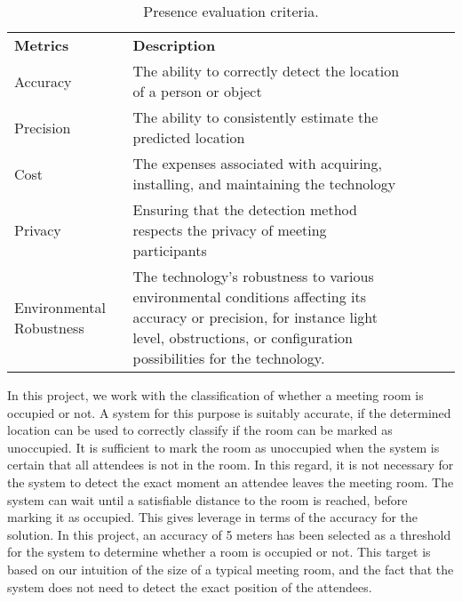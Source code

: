 \begin{table}[H]
    \begin{tabular}{|l|p{85mm}|lll}
    \cline{1-2}
    \textbf{Metrics} & \textbf{Description} &  &  &  \\ \cline{1-2}
    Accuracy         & The ability to correctly detect the location of a person or object &  &  &  \\ \cline{1-2}
    Precision        & The ability to consistently estimate the predicted location                           &  &  &  \\ \cline{1-2}
    Cost             & The expenses associated with acquiring, installing, and maintaining the technology &  &  &  \\ \cline{1-2}
    Privacy          & Ensuring that the detection method respects the privacy of meeting participants    &  &  &  \\ \cline{1-2}
    Environmental Robustness    & The technology's robustness to various environmental conditions affecting its accuracy or precision, for instance light level, obstructions, or configuration possibilities for the technology.                     &  &  &  \\ \cline{1-2}
    \end{tabular}
    \caption{Presence evaluation criteria.}
    \label{lst:presence_eval_criteria}
\end{table}

In this project, we work with the classification of whether a meeting room is occupied or not. 
A system for this purpose is suitably accurate, if the determined location can be used to correctly classify if the room can be marked as unoccupied.
It is sufficient to mark the room as unoccupied when the system is certain that all attendees is not in the room. 
In this regard, it is not necessary for the system to detect the exact moment an attendee leaves the meeting room.
The system can wait until a satisfiable distance to the room is reached, before marking it as occupied. 
This gives leverage in terms of the accuracy for the solution. 
In this project, an accuracy of 5 meters has been selected as a threshold for the system to determine whether a room is occupied or not. This target is based on our intuition of the size of a typical meeting room, and the fact that the system does not need to detect the exact position of the attendees.